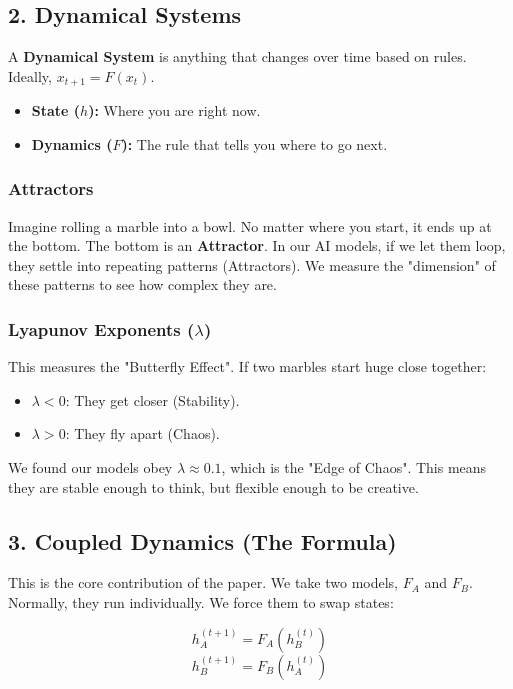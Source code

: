\documentclass[11pt,a4paper]{article}
\begin{document}
\subsection{2. Dynamical Systems}
A \textbf{Dynamical System} is anything that changes over time based on rules. Ideally, $x_{t+1} = F(x_t)$.
\begin{itemize}
    \item \textbf{State ($h$):} Where you are right now.
    \item \textbf{Dynamics ($F$):} The rule that tells you where to go next.
\end{itemize}

\subsubsection{Attractors}
Imagine rolling a marble into a bowl. No matter where you start, it ends up at the bottom. The bottom is an \textbf{Attractor}.
In our AI models, if we let them loop, they settle into repeating patterns (Attractors). We measure the "dimension" of these patterns to see how complex they are.

\subsubsection{Lyapunov Exponents ($\lambda$)}
This measures the "Butterfly Effect". If two marbles start huge close together:
\begin{itemize}
    \item $\lambda < 0$: They get closer (Stability).
    \item $\lambda > 0$: They fly apart (Chaos).
\end{itemize}
We found our models obey $\lambda \approx 0.1$, which is the "Edge of Chaos". This means they are stable enough to think, but flexible enough to be creative.

\subsection{3. Coupled Dynamics (The Formula)}
This is the core contribution of the paper.
We take two models, $F_A$ and $F_B$. Normally, they run individually. We force them to swap states:

\begin{equation}
    h_A^{(t+1)} = F_A(h_B^{(t)})
\end{equation}
\begin{equation}
    h_B^{(t+1)} = F_B(h_A^{(t)})
\end{equation}
\end{document}
